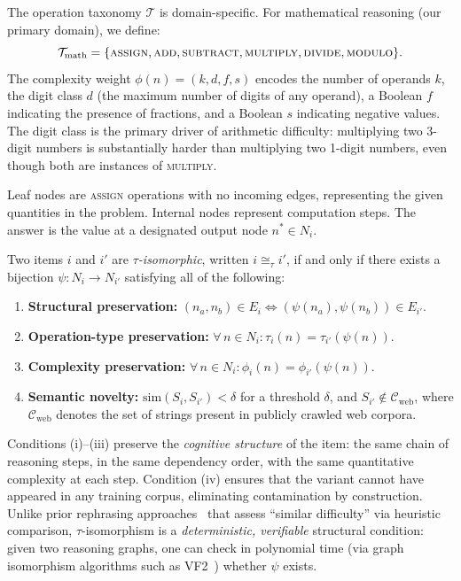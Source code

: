 The operation taxonomy $\mathcal{T}$ is domain-specific. For
mathematical reasoning (our primary domain), we define:
\begin{equation}
\mathcal{T}_{\text{math}} = \{\textsc{assign}, \textsc{add},
\textsc{subtract}, \textsc{multiply}, \textsc{divide},
\textsc{modulo}\}.
\label{eq:taxonomy}
\end{equation}
The complexity weight $\phi(n) = (k, d, f, s)$ encodes the number of
operands $k$, the digit class $d$ (the maximum number of digits of any
operand), a Boolean $f$ indicating the presence of fractions, and a
Boolean $s$ indicating negative values. The digit class is the primary
driver of arithmetic difficulty: multiplying two 3-digit numbers is
substantially harder than multiplying two 1-digit numbers, even though
both are instances of \textsc{multiply}.

Leaf nodes are \textsc{assign} operations with no incoming edges,
representing the given quantities in the problem. Internal nodes
represent computation steps. The answer is the value at a designated
output node $n^* \in N_i$.

\begin{definition}
\label{def:isomorphism}
Two items $i$ and $i'$ are \emph{$\tau$-isomorphic}, written
$i \cong_\tau i'$, if and only if there exists a bijection
$\psi : N_i \to N_{i'}$ satisfying all of the following:
\begin{enumerate}[nosep, leftmargin=*, label=(\roman*)]
\item \textbf{Structural preservation:} $(n_a, n_b) \in E_i
  \iff (\psi(n_a), \psi(n_b)) \in E_{i'}$.
\item \textbf{Operation-type preservation:}
  $\forall\, n \in N_i : \tau_i(n) = \tau_{i'}(\psi(n))$.
\item \textbf{Complexity preservation:}
  $\forall\, n \in N_i : \phi_i(n) = \phi_{i'}(\psi(n))$.
\item \textbf{Semantic novelty:}
  $\mathrm{sim}(S_i, S_{i'}) < \delta$ for a threshold $\delta$, and
  $S_{i'} \notin \mathcal{C}_{\mathrm{web}}$, where
  $\mathcal{C}_{\mathrm{web}}$ denotes the set of strings present in
  publicly crawled web corpora.
\end{enumerate}
\end{definition}

\noindent
Conditions (i)--(iii) preserve the \emph{cognitive structure} of the
item: the same chain of reasoning steps, in the same dependency order,
with the same quantitative complexity at each step. Condition (iv)
ensures that the variant cannot have appeared in any training corpus,
eliminating contamination by construction. Unlike prior rephrasing
approaches~\cite{dekoninck2024constat,zhang2024gsm1k} that assess
``similar difficulty'' via heuristic comparison, $\tau$-isomorphism is a
\emph{deterministic, verifiable} structural condition: given two
reasoning graphs, one can check in polynomial time (via graph
isomorphism algorithms such as VF2~\cite{cordella2004vf2}) whether
$\psi$ exists.

